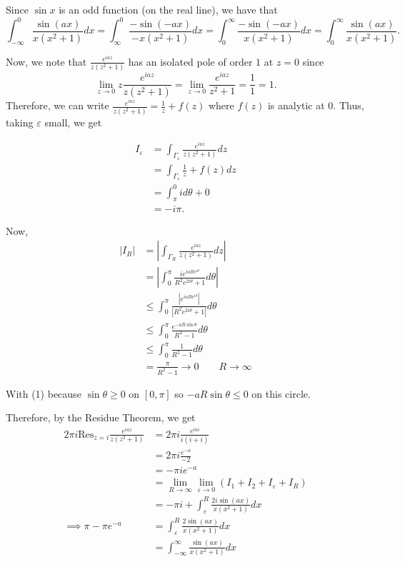 \documentclass[12pt]{Homework}
\newcommand{\res}{\text{Res}}
\begin{document}
\begin{solution}
Since $\sin x$ is an odd function (on the real line), we have that $$\int_{-\infty}^0\frac{\sin(ax)}{x(x^2+1)}dx=\int_\infty^0\frac{-\sin(-ax)}{-x(x^2+1)}dx=\int_0^\infty\frac{-\sin(-ax)}{x(x^2+1)}dx=\int_0^\infty\frac{\sin(ax)}{x(x^2+1)}.$$

Now, we note that $\frac{e^{iaz}}{z(z^2+1)}$ has an isolated pole of order $1$ at $z=0$ since $$\lim_{z\to0}z\frac{e^{iaz}}{z(z^2+1)}=\lim_{z\to 0}\frac{e^{iaz}}{z^2+1}=\frac{1}{1}=1.$$ Therefore, we can write $\frac{e^{iaz}}{z(z^2+1)}=\frac{1}{z}+f(z)$ where $f(z)$ is analytic at $0$. Thus, taking $\varepsilon$ small, we get

\begin{align*}
    I_\varepsilon&=\int_{\Gamma_\varepsilon}\frac{e^{iaz}}{z(z^2+1)}dz\\
    &=\int_{\Gamma_\varepsilon}\frac{1}{z}+f(z)dz\\
    &=\int_\pi^0id\theta+0\\
    &=-i\pi.
\end{align*}

Now, \begin{align*}
    |I_R|&=\left|\int_{\Gamma_R}\frac{e^{iaz}}{z(z^2+1)}dz\right|\\
    &=\left|\int_0^\pi\frac{ie^{iaRe^{i\theta}}}{R^2e^{2i\theta}+1}d\theta\right|\\
    &\le\int_0^\pi\frac{|e^{iaRe^{i\theta}}|}{|R^2e^{2i\theta}+1|}d\theta\\
    &\le\int_0^\pi\frac{e^{-aR\sin\theta}}{R^2-1}d\theta\\
    &\le\int_0^\pi\frac{1}{R^2-1}d\theta\tag{1}\\
    &=\frac{\pi}{R^2-1}\to0\qquad R\to\infty
\end{align*}

With (1) because $\sin\theta\ge0$ on $[0,\pi]$ so $-aR\sin\theta\le 0$ on this circle. 

Therefore, by the Residue Theorem, we get \begin{align*}
    2\pi i\res_{z=i}\frac{e^{iaz}}{z(z^2+1)}&=2\pi i\frac{e^{iai}}{i(i+i)}\\
    &=2\pi i\frac{e^{-a}}{-2}\\
    &=-\pi ie^{-a}\\
    &=\lim_{R\to\infty}\lim_{\varepsilon\to0}(I_1+I_2+I_\varepsilon+I_R)\\
    &=-\pi i+\int_\varepsilon^R\frac{2i\sin(ax)}{x(x^2+1)}dx\\
    \implies \pi-\pi e^{-a}&=\int_\varepsilon^R\frac{2\sin(ax)}{x(x^2+1)}dx\\
    &=\int_{-\infty}^\infty\frac{\sin(ax)}{x(x^2+1)}dx
\end{align*}

\end{solution}
\newpage
\end{document}
